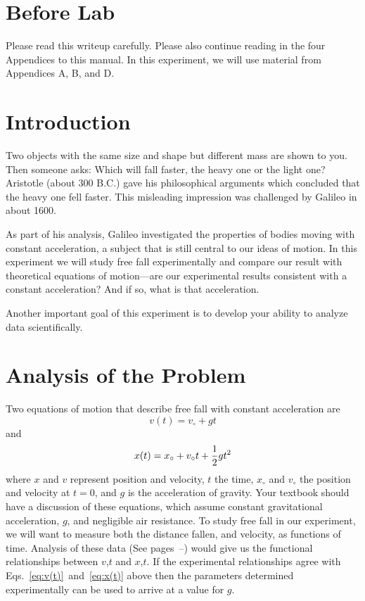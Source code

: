 \newexp

\section*{Before Lab}

Please read this writeup carefully.  Please also continue reading
in the four Appendices to this manual.  In this experiment, we will
use material from Appendices A, B, and D.

\section*{Introduction}
     Two objects with the same size and shape but different mass are
     shown to you.  Then someone asks:
Which will fall faster, the heavy one or the light one?
Aristotle (about 300 B.C.)  gave his philosophical arguments
which concluded that the heavy one fell faster.  This misleading
 impression was challenged by
Galileo in about 1600.

As part of his analysis, Galileo investigated the properties of bodies
moving with constant acceleration, a subject that is still central to
our ideas of motion. In this experiment we will study free fall experimentally
and compare our result with theoretical equations of motion---are our
experimental results consistent with a constant acceleration?  And if so,
what is that acceleration.

  Another important goal of this experiment is to develop your
ability to analyze data scientifically.

\section*{Analysis of the Problem}
Two equations of motion that describe free fall with constant
acceleration are
\begin{equation}
v(t) = v_{\circ} + gt  \label{eq:v(t)}
\end{equation}
 and
\begin{equation}
x(t) = x_{\circ} + v_{\circ}t + {{1} \over {2}} gt^{2}  \label{eq:x(t)}
\end{equation}
where $x$ and $v$ represent position and velocity, $t$ the time, $x_{\circ}$ and
$v_{\circ}$ the position and velocity at $t = 0$, and $g$ is the acceleration
of gravity.  Your textbook should have a discussion of these equations,
which assume constant gravitational
acceleration, $g$, and negligible air resistance.  To study free fall in
our experiment, we will want to measure both the distance fallen, and velocity,
 as functions
of time.  Analysis of these
data (See pages~\pageref{scierror}--\pageref{compassis}) would give us the
functional relationships
between $v$,$t$ and $x$,$t$.  If the experimental relationships agree
with Eqs.~\ref{eq:v(t)}~and~\ref{eq:x(t)} above then the parameters determined
experimentally can be used to arrive at a value for $g$.

